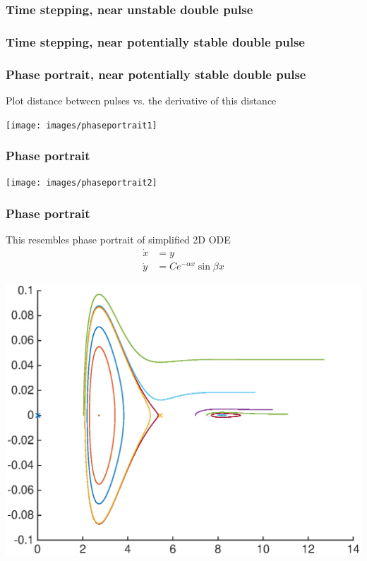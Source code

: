 \documentclass[16pt]{beamer}
\begin{document}
\begin{frame}
	\frametitle{Time stepping, near unstable double pulse}
	\fontsize{16}{7.2}\selectfont
	\begin{center}
	\end{center}
\end{frame}

\begin{frame}
	\frametitle{Time stepping, near potentially stable double pulse}
	\fontsize{16}{7.2}\selectfont
	\begin{center}
	\end{center}
\end{frame}

\begin{frame}
	\frametitle{Phase portrait, near potentially stable double pulse}
	\fontsize{16}{7.2}\selectfont
	Plot distance between pulses vs. the derivative of this distance
	\begin{center}
	\texttt{[image: images/phaseportrait1]}
	\end{center}
\end{frame}

\begin{frame}
	\frametitle{Phase portrait}
	\fontsize{16}{7.2}\selectfont
	\begin{center}
	\texttt{[image: images/phaseportrait2]}
	\end{center}
\end{frame}

\begin{frame}
	\frametitle{Phase portrait}
	\fontsize{16}{7.2}\selectfont
	This resembles phase portrait of simplified 2D ODE
	\begin{align*}
	\dot{x} &= y \\
	\dot{y} &= C e^{-\alpha x} \sin \beta x
	\end{align*}
	\begin{center}
	\includegraphics[width=0.65\linewidth]{images/simplephaseportrait}
	\end{center}
\end{frame}
\end{document}

